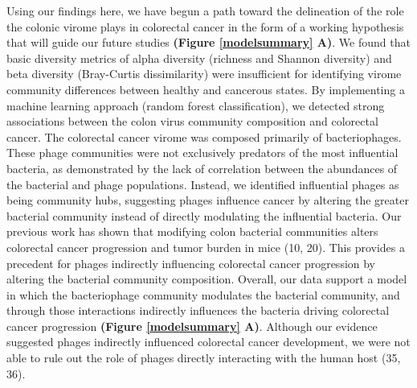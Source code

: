 \documentclass[12pt,]{article}
\begin{document}
Using our findings here, we have begun a path toward the delineation of
the role the colonic virome plays in colorectal cancer in the form of a
working hypothesis that will guide our future studies \textbf{(Figure
\ref{modelsummary} A)}. We found that basic diversity metrics of alpha
diversity (richness and Shannon diversity) and beta diversity
(Bray-Curtis dissimilarity) were insufficient for identifying virome
community differences between healthy and cancerous states. By
implementing a machine learning approach (random forest classification),
we detected strong associations between the colon virus community
composition and colorectal cancer. The colorectal cancer virome was
composed primarily of bacteriophages. These phage communities were not
exclusively predators of the most influential bacteria, as demonstrated
by the lack of correlation between the abundances of the bacterial and
phage populations. Instead, we identified influential phages as being
community hubs, suggesting phages influence cancer by altering the
greater bacterial community instead of directly modulating the
influential bacteria. Our previous work has shown that modifying colon
bacterial communities alters colorectal cancer progression and tumor
burden in mice (10, 20). This provides a precedent for phages indirectly
influencing colorectal cancer progression by altering the bacterial
community composition. Overall, our data support a model in which the
bacteriophage community modulates the bacterial community, and through
those interactions indirectly influences the bacteria driving colorectal
cancer progression \textbf{(Figure \ref{modelsummary} A)}. Although our
evidence suggested phages indirectly influenced colorectal cancer
development, we were not able to rule out the role of phages directly
interacting with the human host (35, 36).
\end{document}
